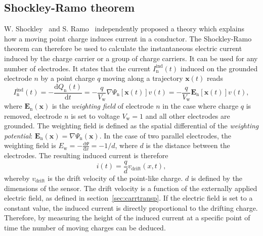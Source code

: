\subsection{Shockley-Ramo theorem}
W. Shockley~\cite{SHOCKLEY:00000} and S. Ramo~\cite{RAMO:00000} independently proposed a theory which explains how a moving point charge induces current in a conductor. The Shockley-Ramo theorem can therefore be used to calculate the instantaneous electric current induced by the charge carrier or a group of charge carriers. It can be used for any number of electrodes. It states that the current $I_\mathrm{n}^{\mathrm{ind}}(t)$ induced on the grounded electrode $n$ by a point charge $q$ moving along a trajectory $\textbf{x}(t)$ reads
\begin{equation}
\label{eq:ramo}
I_\mathrm{n}^{\mathrm{ind}}(t) = -\frac{\mathrm{d}Q_\mathrm{n}(t)}{\mathrm{d}t} =  -\frac{q}{V_\mathrm{w}}\nabla\Psi_\mathrm{n}[\textbf{x}(t)]v(t)  =  -\frac{q}{V_\mathrm{w}}\textbf{E}_\mathrm{n}[\textbf{x}(t)]v(t),
\end{equation}
where $\textbf{E}_\mathrm{n}(\textbf{x})$ is the \emph{weighting field} of electrode $n$ in the case where charge $q$ is removed, electrode $n$ is  set to voltage $V_\mathrm{w}=1$ and all other electrodes are grounded.  The weighting field is defined as the spatial differential of the \emph{weighting potential}: $\textbf{E}_\mathrm{n}(\textbf{x})=\nabla \Psi_\mathrm{n}(\textbf{x})$. In the case of two parallel electrodes, the weighting field is $E_\mathrm{w} = -\frac{\mathrm{d}\Psi}{\mathrm{d}x} = -1/d$, where $d$ is the distance between the electrodes. The resulting induced current is therefore
\begin{equation}
\label{eq:ramoparallel}
i(t) = \frac{q}{d}v_\mathrm{drift}(x,t),
\end{equation} 
whereby $v_{\mathrm{drift}}$ is the drift velocity of the point-like charge. $d$ is defined by the dimensions of the sensor. The drift velocity is a function of the externally applied electric field, as defined in section~\ref{sec:carrtransp}. If the electric field is set to a constant value, the induced current is directly proportional to the drifting charge. Therefore, by measuring the height of the induced current at a specific point of time the number of moving charges can be deduced.








